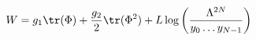 \begin{equation}
    W = g_1 \tr(\Phi) + \frac{g_2}{2} \tr(\Phi^2) + L \log \left ( \frac{\Lambda^{2N}}{y_0 \ldots y_{N-1}}\right )
    \label{eq:potential_phi2}
\end{equation}

